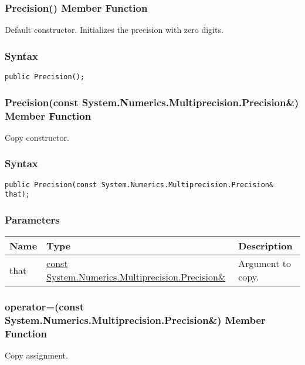 \documentclass[a4paper,oneside,11.000000pt]{book}
\begin{document}
\hypertarget{System.Numerics.Multiprecision.Precision.constructor.P.System.Numerics.Multiprecision.Precision}{\subsubsection*{Precision() Member Function}}
\begin{flushleft}
Default constructor. Initializes the precision with zero digits.

\end{flushleft}
\subsubsection*{Syntax}\texttt{public Precision();}
\clearpage

\hypertarget{System.Numerics.Multiprecision.Precision.constructor.P.System.Numerics.Multiprecision.Precision.C.R.System.Numerics.Multiprecision.Precision}{\subsubsection*{Precision(const System.Numerics.Multiprecision.Precision\&) Member Function}}\begin{flushleft}
Copy constructor.

\end{flushleft}
\subsubsection*{Syntax}
\texttt{public Precision(const System.Numerics.Multiprecision.Precision\& that);}
\subsubsection*{Parameters}
\begin{flushleft}
\begin{supertabular}[l]{!{\raggedright}p{1.30721cm}!{\raggedright}p{8.55945cm}!{\raggedright}p{4.55908cm}}
\textbf{Name}
& \textbf{Type}
& \textbf{Description}
\\
\hline
that
& \hyperlink{System.Numerics.Multiprecision.Precision}{const System.\-Numerics.\-Multiprecision.\-Precision\&\-}
& Argument to copy.

\\
\end{supertabular}

\end{flushleft}
\clearpage

\hypertarget{System.Numerics.Multiprecision.Precision.operator.assign.P.System.Numerics.Multiprecision.Precision.C.R.System.Numerics.Multiprecision.Precision}{\subsubsection*{operator=(const System.Numerics.Multiprecision.Precision\&) Member Function}}\begin{flushleft}
Copy assignment.

\end{flushleft}
\end{document}
